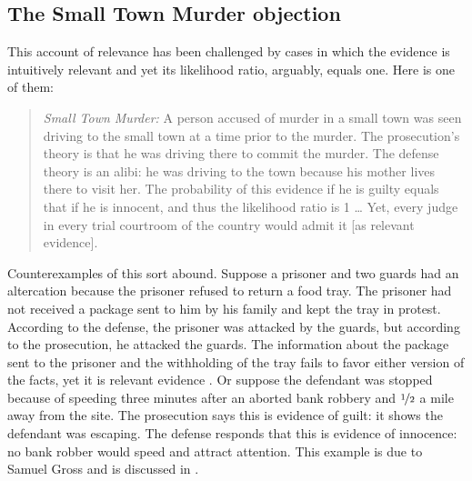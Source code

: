 \documentclass{article}
\begin{document}
\subsection{The Small Town Murder objection}

This account of relevance has been challenged by cases in which the evidence 
is intuitively relevant and yet
its likelihood ratio, arguably, equals one. Here is one of them:
\begin{quote}
	\emph{Small Town Murder:} A person accused of murder in a small town was seen driving to the small town at a time prior to the murder. The prosecution's theory is that he was driving there to commit the murder. The defense theory is an alibi: he was driving to the town because his mother lives there to visit her. The probability of this evidence if he is guilty equals that if he is innocent, and thus the likelihood ratio is 1 \dots %
	Yet, every judge in every trial courtroom of the country would admit it [as relevant evidence]. %
	\citep[The difficulty has been formulated by Ronald Allen, see the discussion in][]{park2010BayesWarsRedivivus}
	\end{quote}
\noindent 
Counterexamples of this sort abound. Suppose a prisoner and two guards had an altercation because the prisoner refused to return a food tray.  The prisoner had not received a package sent to him by his family and kept the tray in protest. According to the defense, the prisoner was attacked by the guards, but according to the prosecution, he attacked the guards. The information about the package sent to the prisoner and the withholding of the tray fails to favor either version of the facts, yet it is relevant evidence \citep{pardo2013NaturePurposeEvidence}.
Or suppose the defendant was stopped because of speeding  three minutes after an aborted bank robbery and $\nicefrac{1}{2}$ a mile away from the site. The prosecution says this is evidence of guilt: it shows the defendant was escaping. The defense responds that this is evidence of innocence: no bank robber would speed and attract attention. 
This example is due to Samuel Gross 
and is discussed in \citep{park2010BayesWarsRedivivus}. 
\end{document}
